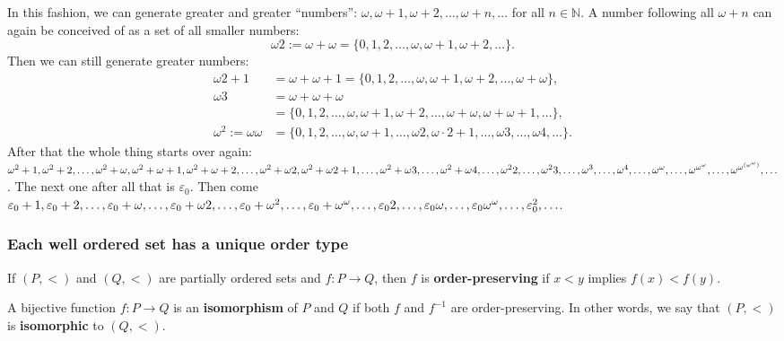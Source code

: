 In this fashion, we can generate greater and greater ``numbers'': $\omega,\omega + 1,\omega + 2,\dots, \omega + n,\dots$ for all $n \in \mathbb{N}$. A number following all $\omega + n$ can again be conceived of as a set of all smaller numbers:
\[ \omega 2 := \omega + \omega = \{0, 1, 2, \ldots, \omega, \omega + 1, \omega + 2, \ldots \}. \]
Then we can still generate greater numbers:
\begin{align*}
	\omega 2 + 1 &= \omega + \omega + 1 = \{0, 1, 2, \ldots, \omega, \omega + 1, \omega + 2, \ldots, \omega + \omega\}, \\
	\omega  3 &= \omega + \omega + \omega \\
	&= \{0, 1, 2, \ldots, \omega, \omega + 1, \omega + 2, \ldots, \omega + \omega, \omega + \omega + 1, \ldots \}, \\
	\omega^2 := \omega  \omega &= \{0, 1, 2, \ldots, \omega, \omega + 1, \ldots, \omega  2, \omega \cdot 2 + 1, \ldots, \omega  3, \ldots, \omega  4, \ldots \}.
\end{align*}
After that the whole thing starts over again: $\omega^2 + 1, \omega^2 + 2, \ldots, \omega^2 + \omega, \omega^2 + \omega + 1, \omega^2 + \omega + 2, \ldots, \omega^2 + \omega 2, \omega^2 + \omega 2 + 1, \ldots, \omega^2 + \omega 3, \ldots, \omega^2 + \omega 4, \ldots, \omega^2 2, \ldots, \omega^2 3, \ldots, \omega^3, \ldots,\break \omega^4, \ldots, \omega^\omega, \ldots, \omega^{\omega^\omega}, \ldots, \omega^{\omega^{(\omega^\omega)}}, \ldots$. The next one after all that is $\varepsilon_0$. Then come $\varepsilon_0 + 1, \varepsilon_0 + 2, \ldots, \varepsilon_0 + \omega, \ldots, \varepsilon_0 + \omega 2, \ldots, \varepsilon_0 + \omega^2, \ldots, \varepsilon_0 + \omega^\omega, \ldots, \varepsilon_0 2, \ldots, \varepsilon_0 \omega, \ldots, \varepsilon_0 \omega^\omega,\break \ldots, \varepsilon_0^2, \ldots $.

\subsubsection{Each well ordered set has a unique order type}


\begin{definition}
	If $(P,<)$ and $(Q,<)$ are partially ordered sets and $f: P \rightarrow Q$, then $f$ is \textbf{order-preserving} if $x < y$ implies $f(x) < f(y)$. 
\end{definition}

\begin{definition}
	A bijective function $f:P\to Q$ is an \textbf{isomorphism} of $P$ and $Q$ if both $f$ and $f^{-1}$ are order-preserving. In other words, we say that $(P,<)$ is \textbf{isomorphic} to $(Q,<)$.
\end{definition}

